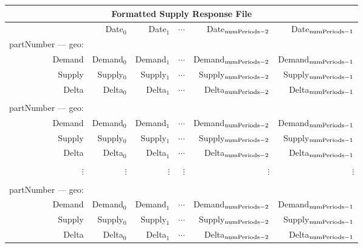 \begin{tabular}{rrrrrr}
\multicolumn{6}{c}{{\bf Formatted Supply Response File}}\\ \hline\hline
  & Date$_0$ & Date$_1$ & $\cdots$ & Date$_{{\rm numPeriods} - 2}$ 
             & Date$_{{\rm numPeriods} - 1}$ \\
partNumber --- geo: \\
Demand & Demand$_0$ & Demand$_1$ & $\cdots$ & Demand$_{{\rm numPeriods} - 2}$ 
             & Demand$_{{\rm numPeriods} - 1}$ \\
Supply & Supply$_0$ & Supply$_1$ & $\cdots$ & Supply$_{{\rm numPeriods} - 2}$ 
             & Supply$_{{\rm numPeriods} - 1}$ \\
Delta & Delta$_0$ & Delta$_1$ & $\cdots$ & Delta$_{{\rm numPeriods} - 2}$ 
             & Delta$_{{\rm numPeriods} - 1}$ \\
\\
partNumber --- geo: \\
Demand & Demand$_0$ & Demand$_1$ & $\cdots$ & Demand$_{{\rm numPeriods} - 2}$ 
             & Demand$_{{\rm numPeriods} - 1}$ \\
Supply & Supply$_0$ & Supply$_1$ & $\cdots$ & Supply$_{{\rm numPeriods} - 2}$ 
             & Supply$_{{\rm numPeriods} - 1}$ \\
Delta & Delta$_0$ & Delta$_1$ & $\cdots$ & Delta$_{{\rm numPeriods} - 2}$ 
             & Delta$_{{\rm numPeriods} - 1}$ \\
\\
$\vdots $ & $\vdots $ & $\vdots $ & $\vdots $ & $\vdots $ & $\vdots $ \\
\\
partNumber --- geo: \\
Demand & Demand$_0$ & Demand$_1$ & $\cdots$ & Demand$_{{\rm numPeriods} - 2}$ 
             & Demand$_{{\rm numPeriods} - 1}$ \\
Supply & Supply$_0$ & Supply$_1$ & $\cdots$ & Supply$_{{\rm numPeriods} - 2}$ 
             & Supply$_{{\rm numPeriods} - 1}$ \\
Delta & Delta$_0$ & Delta$_1$ & $\cdots$ & Delta$_{{\rm numPeriods} - 2}$ 
             & Delta$_{{\rm numPeriods} - 1}$ 
\end{tabular}

